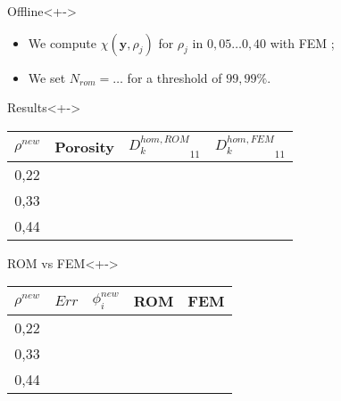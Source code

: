 \begin{frame}%
%
\begin{block}{Offline}<+->
\begin{itemize}
\item<+-> We compute $\chi(\mathbf{y},\rho_j)$ for $\rho_j$ in $0,05 \dots 0,40$ with FEM ;
\item<+-> We set $N_{rom}=\dots$ for a threshold of $99,99\%$.
\end{itemize}
\end{block}
%
\begin{block}{Results}<+->
%
\begin{center}
\begin{tabular}{|c|c||c|c||}%
\hline
$\rho^{new}$&Porosity&${D_k^{hom,ROM}}_{11}$&${D_k^{hom,FEM}}_{11}$\\%
\hline
0,22&&&\\%
\hline
0,33&&&\\%
\hline
0,44&&&\\%
\hline
\end{tabular}
\end{center}
%
\end{block}
%
\begin{block}{ROM vs FEM}<+->
%
\begin{center}
\begin{tabular}{|c|c||c|c||c|}%
\hline
$\rho^{new}$&$Err$&$\phi_i^{new}$&ROM&FEM\\
\hline
0,22&&&&\\
\hline
0,33&&&&\\
\hline
0,44&&&&\\
\hline
\end{tabular}
\end{center}
%
\end{block}
%
\end{frame}